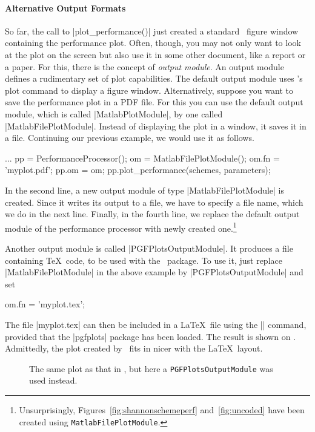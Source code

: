 \paragraph{Alternative Output Formats}
So far, the call to |plot_performance()| just created a standard \matlab\ figure
window containing the performance plot. Often, though, you may not only want to
look at the plot on the screen but also use it in some other document, like a
report or a paper. For this, there is the concept of \emph{output module}. An
output module defines a rudimentary set of plot capabilities. The default output
module uses \matlab's plot command to display a figure window. Alternatively,
suppose you want to save the performance plot in a PDF file. For this you can
use the default output module, which is called |MatlabPlotModule|, by one called
|MatlabFilePlotModule|. Instead of displaying the plot in a window, it saves it
in a file. Continuing our previous example, we would use it as follows.
\begin{Code}
  ...  %
  pp = PerformanceProcessor();
  om = MatlabFilePlotModule();
  om.fn = 'myplot.pdf';
  pp.om = om;
  pp.plot_performance(schemes, parameters);  %
\end{Code}
In the second line, a new output module of type |MatlabFilePlotModule| is
created. Since it writes its output to a file, we have to specify a file name,
which we do in the next line. Finally, in the fourth line, we replace the
default output module of the performance processor with newly created
one.\footnote{Unsurprisingly, Figures~\ref{fig:shannonschemeperf}
and~\ref{fig:uncoded} have been created using \Verb+MatlabFilePlotModule+.}

Another output module is called |PGFPlotsOutputModule|. It produces a file
containing \TeX\ code, to be used with the \pgfplots\ package. To use it, just
replace |MatlabFilePlotModule| in the above example by |PGFPlotsOutputModule|
and set \eg
\begin{Code}
  om.fn = 'myplot.tex';
\end{Code}
The file |myplot.tex| can then be included in a \LaTeX\ file using the ||
command, provided that the |pgfplots| package has been loaded.  The result is
shown on . Admittedly, the plot created by \pgfplots\ fits in
nicer with the \LaTeX\ layout.

\begin{figure}
  \begin{center}
    
  \end{center}
  \caption{The same plot as that in , but here a
  \texttt{PGFPlotsOutputModule} was used instead.}
  \label{fig:uncodedpgf}
\end{figure}


